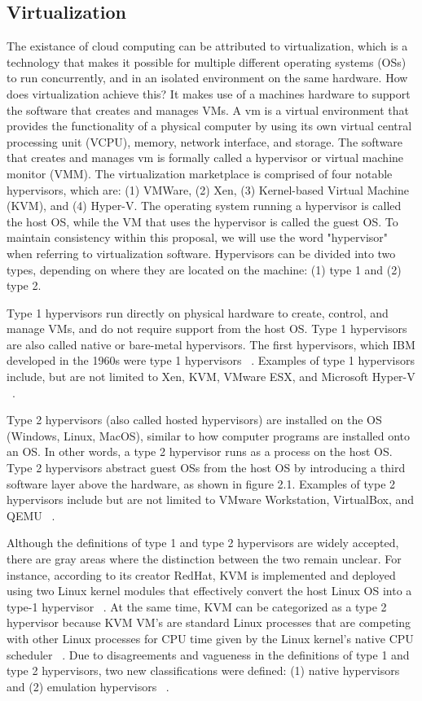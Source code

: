 \documentclass[12pt]{report}
\begin{document}
\begin{doublespace}
\section{Virtualization}

The existance of cloud computing can be attributed to virtualization, which is a technology that makes it possible for multiple different operating systems (OSs) to run concurrently, and in an isolated environment on the same hardware. How does virtualization achieve this? It makes use of a machines hardware to support the software that creates and manages VMs. A vm is a virtual environment that provides the functionality of a physical computer by using its own virtual central processing unit (VCPU), memory, network interface, and storage. The software that creates and manages vm is formally called a hypervisor or virtual machine monitor (VMM). The virtualization marketplace is comprised of four notable hypervisors, which are: (1) VMWare, (2) Xen, (3) Kernel-based Virtual Machine (KVM), and (4) Hyper-V. The operating system running a hypervisor is called the host OS, while the VM that uses the hypervisor is called the guest OS. To maintain consistency within this proposal, we will use the word "hypervisor" when referring to virtualization software. Hypervisors can be divided into two types, depending on where they are located on the machine: (1) type 1 and (2) type 2.

Type 1 hypervisors run directly on physical hardware to create, control, and manage VMs, and do not require support from the host OS. Type 1 hypervisors are also called native or bare-metal hypervisors. The first hypervisors, which IBM developed in the 1960s were type 1 hypervisors ~\cite{meier2008ibm}. Examples of type 1 hypervisors include, but are not limited to Xen, KVM, VMware ESX, and Microsoft Hyper-V ~\cite{bauman2015survey}.

Type 2 hypervisors (also called hosted hypervisors) are installed on the OS (Windows, Linux, MacOS), similar to how computer programs are installed onto an OS. In other words, a type 2 hypervisor runs as a process on the host OS. Type 2 hypervisors abstract guest OSs from the host OS by introducing a third software layer above the hardware, as shown in figure 2.1. Examples of type 2 hypervisors include but are not limited to VMware Workstation, VirtualBox, and QEMU ~\cite{bauman2015survey}.

Although the definitions of type 1 and type 2 hypervisors are widely accepted, there are gray areas where the distinction between the two remain unclear. For instance, according to its creator RedHat, KVM is implemented and deployed using two Linux kernel modules that effectively convert the host Linux OS into a type-1 hypervisor ~\cite{graziano2011performance}. At the same time, KVM can be categorized as a type 2 hypervisor because KVM VM's are standard Linux processes that are competing with other Linux processes for CPU time given by the Linux kernel's native CPU scheduler ~\cite{kvmcpuschedule}. Due to disagreements and vagueness in the definitions of type 1 and type 2 hypervisors, two new classifications were defined: (1) native hypervisors and (2) emulation hypervisors ~\cite{10.1145/2775111}.


\end{doublespace}
\end{document}
